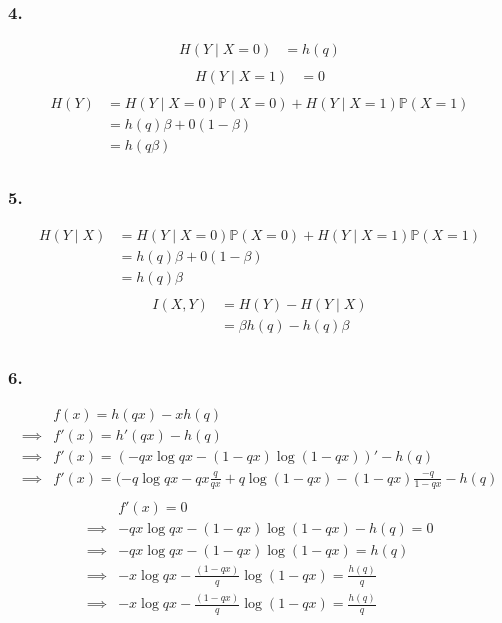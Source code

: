\documentclass{article}
\newcommand{\1}{\mathbf{1}}
\renewcommand{\P}{\mathbb{P}}
\begin{document}
\subsubsection{4.}
\begin{align*}
  H(Y \mid X = 0)
   & = h(q) \\
\end{align*}
\begin{align*}
  H(Y \mid X = 1)
   & = 0 \\
\end{align*}
\begin{align*}
  H(Y)
   & = H(Y \mid X = 0) \P(X = 0) + H(Y \mid X = 1) \P(X = 1) \\
   & = h(q) \beta + 0 (1 - \beta)                            \\
   & = h(q\beta)                                             \\
\end{align*}

\subsubsection{5.}
\begin{align*}
  H(Y \mid X)
   & = H(Y \mid X = 0) \P(X = 0) + H(Y \mid X = 1) \P(X = 1) \\
   & = h(q) \beta + 0 (1 - \beta)                            \\
   & = h(q) \beta                                            \\
\end{align*}
\begin{align*}
  I(X, Y)
   & = H(Y) - H(Y \mid X)     \\
   & = \beta h(q) - h(q)\beta \\
\end{align*}
\subsubsection{6.}
\begin{align*}
           &
  f(x) = h(qx) - x h(q)                               \\
  \implies &
  f'(x) = h'(qx) - h(q)                               \\
  \implies &
  f'(x) = (- qx\log qx - (1 - qx) \log (1 - qx))' - h(q) \\
  \implies &
  f'(x) = (- q\log qx - qx \frac{q}{qx} + q\log (1 - qx) - (1 - qx) \frac{-q}{1 - qx} - h(q) \\
\end{align*}
\begin{align*}
           &
  f'(x) = 0                                        \\
  \implies &
  - qx\log qx - (1 - qx) \log (1 - qx) - h(q)  = 0 \\
  \implies &
  - qx\log qx - (1 - qx) \log (1 - qx) = h(q)      \\
  \implies &
  - x\log qx - \frac{(1 - qx)}{q} \log (1 - qx) = \frac{h(q)}{q}      \\
  \implies &
  - x\log qx - \frac{(1 - qx)}{q} \log (1 - qx) = \frac{h(q)}{q}      \\
\end{align*}
\end{document}
